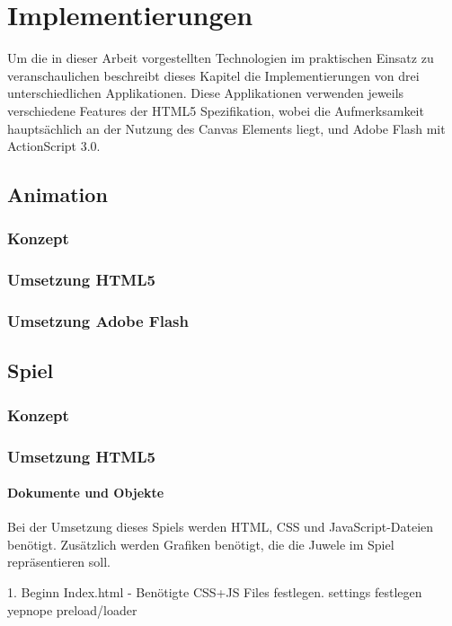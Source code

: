 \chapter{Implementierungen}

Um die in dieser Arbeit vorgestellten Technologien im praktischen Einsatz zu
veranschaulichen beschreibt dieses Kapitel die Implementierungen von drei
unterschiedlichen Applikationen. Diese Applikationen verwenden jeweils
verschiedene Features der HTML5 Spezifikation, wobei die Aufmerksamkeit
hauptsächlich an der Nutzung des Canvas Elements liegt, und Adobe Flash mit
ActionScript 3.0.

\section{Animation}

\subsection{Konzept}
\subsection{Umsetzung HTML5}
\subsection{Umsetzung Adobe Flash}

\section{Spiel}

\subsection{Konzept}
\subsection{Umsetzung HTML5}

  \subsubsection{Dokumente und Objekte}
  Bei der Umsetzung dieses Spiels werden HTML, CSS und JavaScript-Dateien
  benötigt. Zusätzlich werden Grafiken benötigt, die die Juwele im Spiel
  repräsentieren soll.

  1. Beginn
  Index.html - Benötigte CSS+JS Files festlegen.
  settings festlegen
  yepnope preload/loader

